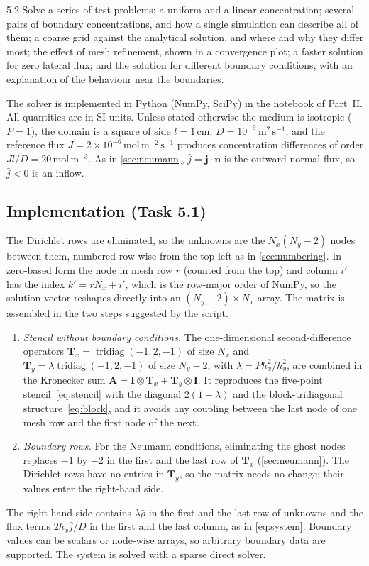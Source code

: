 \documentclass[11pt,a4paper]{article}
\numberwithin{equation}{section}
\theoremstyle{definition}
\theoremstyle{remark}
\newcommand{\bj}{\bm{j}}
\newcommand{\bn}{\bm{n}}
\newcommand{\bA}{\mathbf{A}}
\newcommand{\bT}{\mathbf{T}}
\newcommand{\bI}{\mathbf{I}}
\begin{document}
\begin{task}{5.2}
  Solve a series of test problems: a uniform and a linear concentration; several pairs of
  boundary concentrations, and how a single simulation can describe all of them; a coarse grid
  against the analytical solution, and where and why they differ most; the effect of mesh
  refinement, shown in a convergence plot; a faster solution for zero lateral flux; and the
  solution for different boundary conditions, with an explanation of the behaviour near the
  boundaries.
\end{task}

The solver is implemented in Python (NumPy, SciPy) in the notebook of Part~II. All quantities are in
SI units. Unless stated otherwise the medium is isotropic ($P = 1$), the domain is a square of side
$l = 1\,\mathrm{cm}$, $D = 10^{-9}\,\mathrm{m^2\,s^{-1}}$, and the reference flux
$J = 2\times10^{-6}\,\mathrm{mol\,m^{-2}\,s^{-1}}$ produces concentration differences of order
$Jl/D = 20\,\mathrm{mol\,m^{-3}}$. As in \cref{sec:neumann}, $\bar j = \bj\cdot\bn$ is the outward
normal flux, so $\bar j < 0$ is an inflow.

\subsection{Implementation (Task 5.1)}\label{sec:implementation}

The Dirichlet rows are eliminated, so the unknowns are the $N_x(N_y-2)$ nodes between them,
numbered row-wise from the top left as in \cref{sec:numbering}. In zero-based form the node in mesh
row $r$ (counted from the top) and column $i'$ has the index $k' = rN_x + i'$, which is the row-major
order of NumPy, so the solution vector reshapes directly into an $(N_y-2)\times N_x$ array. The
matrix is assembled in the two steps suggested by the script.
\begin{enumerate}\setlength{\itemsep}{2pt}
  \item \emph{Stencil without boundary conditions.} The one-dimensional second-difference operators
    $\bT_x = \operatorname{tridiag}(-1, 2, -1)$ of size $N_x$ and
    $\bT_y = \lambda\operatorname{tridiag}(-1, 2, -1)$ of size $N_y - 2$, with
    $\lambda = P h_x^2/h_y^2$, are combined in the Kronecker sum
    $\bA = \bI\otimes\bT_x + \bT_y\otimes\bI$. It reproduces the five-point
    stencil~\eqref{eq:stencil} with the diagonal $2(1+\lambda)$ and the block-tridiagonal
    structure~\eqref{eq:block}, and it avoids any coupling between the last node of one mesh row
    and the first node of the next.
  \item \emph{Boundary rows.} For the Neumann conditions, eliminating the ghost nodes replaces $-1$
    by $-2$ in the first and the last row of $\bT_x$ (\cref{sec:neumann}). The Dirichlet rows have
    no entries in $\bT_y$, so the matrix needs no change; their values enter the right-hand side.
\end{enumerate}
The right-hand side contains $\lambda\bar\rho$ in the first and the last row of unknowns and the
flux terms $2h_x\bar j/D$ in the first and the last column, as in \eqref{eq:system}. Boundary
values can be scalars or node-wise arrays, so arbitrary boundary data are supported. The system is
solved with a sparse direct solver.
\end{document}
